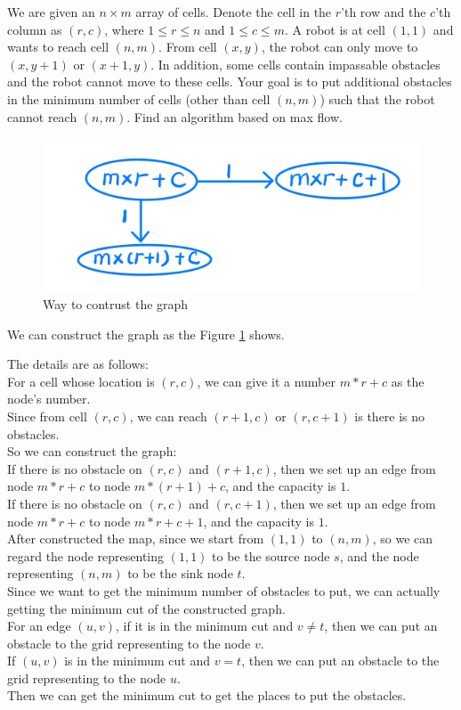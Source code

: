 \problem{}
We are given an $n \times m$ array of cells. Denote the cell in the $r$'th row and the $c$'th column as $(r,c)$, where $1 \leq r \leq n$ and $1 \leq c \leq m$. A robot is at cell $(1, 1)$ and wants to reach cell $(n, m)$. From cell $(x, y)$, the robot can only move to $(x,y+1)$ or $(x+1,y)$. In addition, some cells contain impassable obstacles and the robot cannot move to these cells. Your goal is to put additional obstacles in the minimum number of cells (other than cell $(n, m)$) such that the robot cannot reach $(n, m)$.  Find an algorithm based on max flow.  

\solution{}
\begin{figure}[htbp]
    \centering
    \includegraphics[width=\linewidth]{../fig/p2.png}
    \caption{Way to contrust the graph}
    \label{fig:p2}
\end{figure}

We can construct the graph as the Figure \ref{fig:p2} shows.

The details are as follows:\\
For a cell whose location is $(r,c)$, we can give it a number $m*r+c$ as the node's number.\\
Since from cell $(r,c)$, we can reach $(r+1,c)$ or $(r,c+1)$ is there is no obstacles.\\
So we can construct the graph:\\
If there is no obstacle on $(r,c)$ and $(r+1,c)$, then we set up an edge from node $m*r+c$ to node $m*(r+1)+c$, and the capacity is $1$.\\
If there is no obstacle on $(r,c)$ and $(r,c+1)$, then we set up an edge from node $m*r+c$ to node $m*r+c+1$, and the capacity is $1$.\\

After constructed the map, since we start from $(1,1)$ to $(n,m)$, so we can regard the node representing $(1,1)$ to be the source node $s$, and the node representing $(n,m)$ to be the sink node $t$.\\
Since we want to get the minimum number of obstacles to put, we can actually getting the minimum cut of the constructed graph.\\
For an edge $(u,v)$, if it is in the minimum cut and $v\neq t$, then we can put an obstacle to the grid representing to the node $v$.\\
If $(u,v)$ is in the minimum cut and $v = t$, then we can put an obstacle to the grid representing to the node $u$.\\
Then we can get the minimum cut to get the places to put the obstacles.\\

